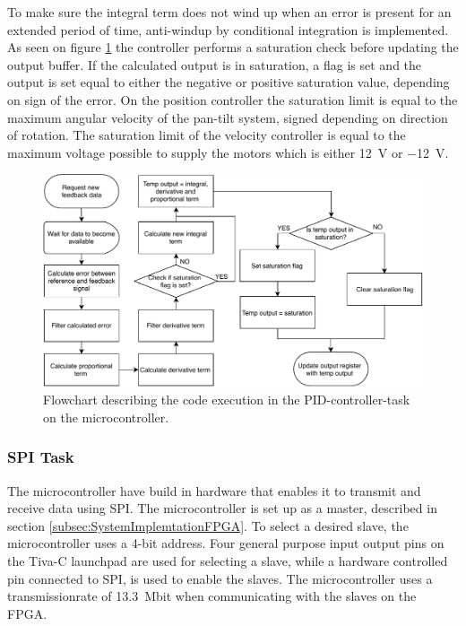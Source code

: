 \documentclass[../../main.tex]{subfiles}
\begin{document}
To make sure the integral term does not wind up when an error is present for an extended period of time, anti-windup by conditional integration is implemented. As seen on figure \ref{fig:PIDControllerFlowchart} the controller performs a saturation check before updating the output buffer. If the calculated output is in saturation, a flag is set and the output is set equal to either the negative or positive saturation value, depending on sign of the error. On the position controller the saturation limit is equal to the maximum angular velocity of the pan-tilt system, signed depending on direction of rotation. The saturation limit of the velocity controller is equal to the maximum voltage possible to supply the motors which is either \SI{12}{\volt} or \SI{-12}{\volt}.

\begin{figure}[H]
    \centering
    \includegraphics[width=\textwidth]{Sections/System_Implementation/Images/PIDControllerFlowchart.pdf}
    \caption{Flowchart describing the code execution in the PID-controller-task on the microcontroller.}
    \label{fig:PIDControllerFlowchart}
\end{figure}





\subsubsection*{SPI Task}
The microcontroller have build in hardware that enables it to transmit and receive data using SPI. The microcontroller is set up as a master, described in section \ref{subsec:SystemImplemtationFPGA}. To select a desired slave, the microcontroller uses a 4-bit address. Four general purpose input output pins on the Tiva-C launchpad are used for selecting a slave, while a hardware controlled pin connected to SPI, is used to enable the slaves. The microcontroller uses a transmissionrate of \SI{13.3}{\mega bit} when communicating with the slaves on the FPGA. 
\end{document}
